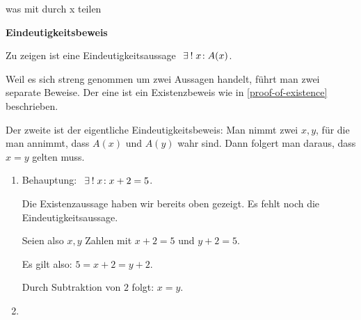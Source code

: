 \begin{example}
    was mit durch x teilen
\end{example}

\begin{shadedbox}
    \textbf{Eindeutigkeitsbeweis}

    Zu zeigen ist eine Eindeutigkeitsaussage $\existsone x\!: A(x)$.

    Weil es sich streng genommen um zwei Aussagen handelt, führt man zwei separate Beweise. Der eine ist ein Existenzbeweis wie in \ref{proof-of-existence} beschrieben.\footnotemark

    Der zweite ist der eigentliche Eindeutigkeitsbeweis: Man nimmt zwei $x, y$, für die man annimmt, dass $A(x)$ und $A(y)$ wahr sind. Dann folgert man daraus, dass $x = y$ gelten muss.
\end{shadedbox}

\begin{example}
    \begin{enumerate}
        \item Behauptung: $\existsone x\!: x + 2 = 5$.

        Die Existenzaussage haben wir bereits oben gezeigt. Es fehlt noch die Eindeutigkeitsaussage.

        Seien also $x, y$ Zahlen mit $x + 2 = 5$ und $y + 2 = 5$.

        Es gilt also: $5 = x + 2 = y + 2$.

        Durch Subtraktion von $2$ folgt: $x = y$.
        \item 
    \end{enumerate}
\end{example}

